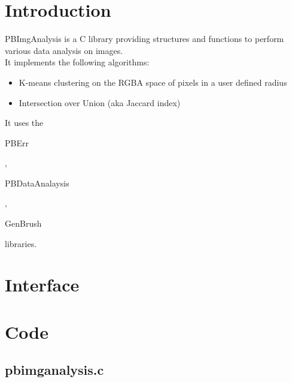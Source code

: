 \section*{Introduction}

PBImgAnalysis is a C library providing structures and functions to perform various data analysis on images.\\ 

It implements the following algorithms:
\begin{itemize}
\item K-means clustering on the RGBA space of pixels in a user defined radius
\item Intersection over Union (aka Jaccard index)
\end{itemize}

It uses the \begin{ttfamily}PBErr\end{ttfamily}, \begin{ttfamily}PBDataAnalaysis\end{ttfamily}, \begin{ttfamily}GenBrush\end{ttfamily} libraries.\\

\section{Interface}

\begin{scriptsize}
\begin{ttfamily}

\end{ttfamily}
\end{scriptsize}

\section{Code}

\subsection{pbimganalysis.c}

\begin{scriptsize}
\begin{ttfamily}

\end{ttfamily}
\end{scriptsize}

